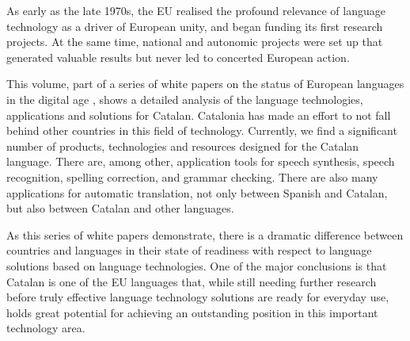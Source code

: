 \begin{multicols}{2}
As early as the late 1970s, the EU realised the profound relevance of language technology as a driver of European unity, and began funding its first research projects. At the same time, national and autonomic projects were set up that generated valuable results but never led to concerted European action. 


This volume, part of a series of white papers on the status of European languages in the digital age \cite{Meta1}, shows a detailed analysis of the language technologies, applications and solutions for Catalan. Catalonia has made an effort to not fall behind other countries in this field of technology. Currently, we find a significant number of products, technologies and resources designed for the Catalan language. There are, among other, application tools for speech synthesis, speech recognition, spelling correction, and grammar checking. There are also many applications for automatic translation, not only between Spanish and Catalan, but also between Catalan and other languages.

As this series of white papers demonstrate, there is a dramatic difference between countries and languages in their state of readiness with respect to language solutions based on language technologies. One of the major conclusions is that Catalan is one of the EU languages that, while still needing further research before truly effective language technology solutions are ready for everyday use, holds great potential for achieving an outstanding position in this important technology area.

\end{multicols}

\clearpage



